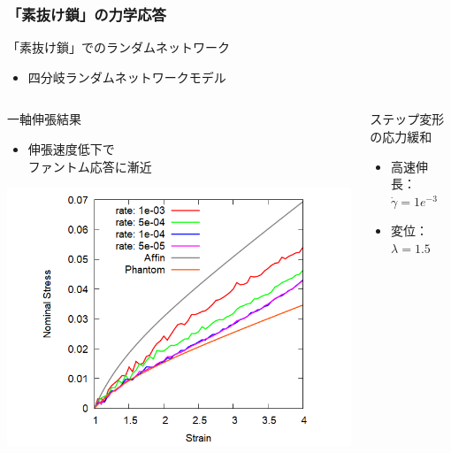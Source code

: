 \documentclass[12pt, dvipdfmx]{beamer}
\begin{document}
\begin{frame}
	\frametitle{「素抜け鎖」の力学応答}
		\begin{alertblock}{「素抜け鎖」でのランダムネットワーク}
			\begin{itemize}
				\item 四分岐ランダムネットワークモデル
			\end{itemize}
        \end{alertblock}
        \vspace{-3mm}
		\begin{columns}[totalwidth=\linewidth]
				\begin{block}{一軸伸張結果}
					\begin{itemize}
						\item 伸張速度低下で\\\alert{ファントム応答}に漸近
                    \end{itemize}
                    \begin{center}
                        \includegraphics[width=.9\columnwidth]{N48_sunuke.png}
                    \end{center}
				\end{block}
				\begin{exampleblock}{ステップ変形の応力緩和}
                    \begin{itemize}
                        \item 高速伸長：$\dot{\gamma} = 1e^{-3}$
                        \item 変位：$\lambda = 1.5$

\end{itemize}
\end{exampleblock}
\end{columns}
\end{frame}
\end{document}
